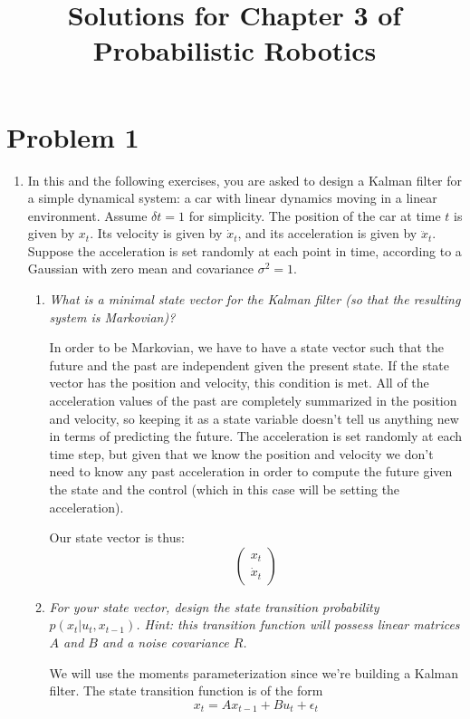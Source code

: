 \documentclass[10pt]{article}
\begin{document}
\title{Solutions for Chapter 3 of Probabilistic Robotics}

\section{Problem 1}
\begin{enumerate}
  \item In this and the following exercises, you are asked to design a Kalman
filter for a simple dynamical system: a car with linear dynamics moving in a
linear environment. Assume $\delta t = 1$ for simplicity. The position of the
car at time $t$ is given by $x_t$. Its velocity is given by $\dot{x}_t$, and its
acceleration is given by $\ddot{x}_t$. Suppose the acceleration is set
randomly at each point in time, according to a Gaussian with zero mean and
covariance $\sigma^2 = 1$.

  \begin{enumerate}
  \item \textit{What is a minimal state vector for the Kalman filter (so that the
    resulting system is Markovian)?} 

    In order to be Markovian, we have to have a state vector such that the
    future and the past are independent given the present state. If the state
    vector has the position and velocity, this condition is met. All of the
    acceleration values of the past are completely summarized in the position
    and velocity, so keeping it as a state variable doesn't tell us anything new
    in terms of predicting the future. The acceleration is set randomly at each
    time step, but given that we know the position and velocity we don't need to
    know any past acceleration in order to compute the future given the state
    and the control (which in this case will be setting the acceleration).

    Our state vector is thus:
  $$\begin{pmatrix}x_t \\ \dot{x}_t\end{pmatrix}$$

  \item \textit{For your state vector, design the state transition probability 
    $p(x_t | u_t,x_{t-1})$. Hint: this transition function will possess linear
  matrices $A$ and $B$ and a noise covariance $R$.}

  We will use the moments parameterization since we're building a Kalman filter.
  The state transition function is of the form
  $$x_t = A x_{t-1} + B u_t + \epsilon_t$$


\end{enumerate}
\end{enumerate}
\end{document}
